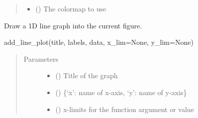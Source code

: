 \documentclass[letterpaper,10pt,english,openany,oneside]{sphinxmanual}
\begin{document}
\begin{fulllineitems}
\begin{fulllineitems}
\begin{quote}
\begin{description}
\begin{itemize}
\item {} 
 (\sphinxstyleliteralemphasis{\sphinxupquote{, }}\sphinxstyleliteralemphasis{\sphinxupquote{, }}) \textendash{} The colormap to use

\end{itemize}

\end{description}\end{quote}

\end{fulllineitems}


\begin{fulllineitems}
\label{\detokenize{pygpc:pygpc.Visualization.Visualization.add_line_plot}}
Draw a 1D line graph into the current figure.

add\_line\_plot(title, labels, data, x\_lim=None, y\_lim=None)
\begin{quote}\begin{description}
\item[{Parameters}] \leavevmode\begin{itemize}
\item {} 
 () \textendash{} Title of the graph

\item {} 
 () \textendash{} \{‘x’: name of x-axis, ‘y’: name of y-axis\}

\item {} 
 (\sphinxstyleliteralemphasis{\sphinxupquote{ {[}}}\sphinxstyleliteralemphasis{\sphinxupquote{{]}}}\sphinxstyleliteralemphasis{\sphinxupquote{, }}\sphinxstyleliteralemphasis{\sphinxupquote{, }}) \textendash{} x-limits for the function argument or value


\end{itemize}
\end{description}
\end{quote}
\end{fulllineitems}
\end{fulllineitems}
\end{document}
